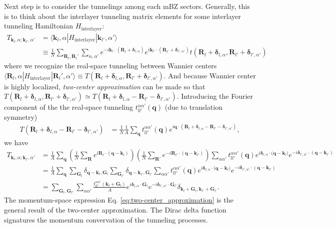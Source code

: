 Next step is to consider the tunnelings among each mBZ sectors. Generally, this is to think about the interlayer tunneling matrix elements for some interlayer tunneling Hamiltonian $H_{\text{interlayer}}$:
\begin{align*}
    T_{\bm k_l,\alpha;\bm k_{l'},\alpha'} & = \langle\bm k_l,\alpha|H_{\text{interlayer}}|\bm k_{l'},\alpha'\rangle                                                                                                                                                                 \\
                                          & \equiv\frac{1}{N}\sum_{\bm R_l,\bm R_l'}\sum_{\alpha,\alpha'} e^{-i\bm k_l\cdot(\bm R_l+\bm\delta_{l,\alpha})}e^{i\bm k_{l'}\cdot(\bm R_{l'}+\bm\delta_{l',\alpha'})}t(\bm R_l+\bm\delta_{l,\alpha}, \bm R_{l'}+\bm\delta_{l',\alpha'})
\end{align*}
where we recognize the real-space tunneling between Wannier centers $\langle\bm R_l,\alpha|H_{\text{interlayer}}|\bm R_l',\alpha'\rangle\equiv T(\bm R_l+\bm\delta_{l,\alpha}, \bm R_{l'}+\bm\delta_{l',\alpha'})$. And because Wannier center is highly localized, \emph{two-center approximation} \cite{bistritzer2011moire} can be made so that $T(\bm R_l+\bm\delta_{l,\alpha}, \bm R_{l'}+\bm\delta_{l',\alpha'})\simeq T(\bm R_l+\bm\delta_{l,\alpha} - \bm R_{l'}-\bm\delta_{l',\alpha'})$. Introducing the Fourier component of the the real-space tunneling $t_{ll'}^{\alpha\alpha'}(\bm q)$ (due to translation symmetry)
\begin{align*}
    T(\bm R_l+\bm\delta_{l,\alpha} - \bm R_{l'}-\bm\delta_{l',\alpha'}) & = \frac{1}{N}\frac{1}{A}\sum_{\bm q}t_{ll'}^{\alpha\alpha'}(\bm q) e^{i\bm q\cdot(\bm R_l+\bm\delta_{l,\alpha} - \bm R_{l'}-\bm\delta_{l',\alpha'})},
\end{align*}
we have
\begin{align}
    T_{\bm k_l,\alpha;\bm k_{l'},\alpha'} & =\frac{1}{A}\sum_{\bm q}\left(\frac{1}{N}\sum_{\bm R}e^{i\bm R_l\cdot(\bm q-\bm k_l)}\right)\left(\frac{1}{N}\sum_{\bm R'}e^{-i\bm R_{l'}\cdot(\bm q-\bm k_{l'})}\right) \sum_{\alpha\alpha'} t_{ll'}^{\alpha\alpha'}(\bm q) e^{i\bm \delta_{l,\alpha}\cdot\bm(\bm q-\bm k_l)}e^{-i\bm\delta_{l',\alpha'}\cdot(\bm q-\bm k_{l'})} \nonumber \\
                                          & = \frac{1}{A}\sum_{\bm q}\sum_{\bm G_l}\delta_{\bm q-\bm k_l,\bm G_l}\sum_{\bm G_{l'}}\delta_{\bm q-\bm k_{l'},\bm G_{l'}}\sum_{\alpha\alpha'} t_{ll'}^{\alpha\alpha'}(\bm q) e^{i\bm \delta_{l,\alpha}\cdot\bm(\bm q-\bm k_l)}e^{-i\bm\delta_{l',\alpha'}\cdot(\bm q-\bm k_{l'})}                                                \nonumber \\
                                          & = \sum_{\bm G_l,\bm G_{l'}}\sum_{\alpha\alpha'} \frac{t_{ll'}^{\alpha\alpha'}(\bm k_l+\bm G_l)}{A} e^{i\bm\delta_{l,\alpha}\cdot\bm G_l}e^{-i\bm \delta_{l',\alpha'}\cdot\bm G_{l'}}\delta_{\bm k_l+\bm G_l,\bm k_{l'}+\bm G_{l'}}.\label{eq:two-center_approximation}
\end{align}
The momentum-space expression Eq. \eqref{eq:two-center_approximation} is the general result of the two-center approximation. The Dirac delta function signatures the momentum convervation of the tunneling processes.

